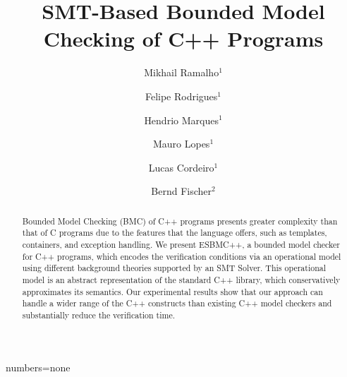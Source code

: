 \documentclass[a4paper]{llncs}
\begin{document}
{numbers=none}
\lstset{language=C,basicstyle=\small}
\lstset{numbers=left, numberstyle=\tiny, stepnumber=1, numbersep=5pt}
\lstset{tabsize=2}
\lstset{firstnumber=1}
\lstset{frame=single}


\title{SMT-Based Bounded Model Checking of C++ Programs}
\author{Mikhail Ramalho$^1$ 	\and
	Felipe Rodrigues$^1$   	\and
	Hendrio Marques$^1$   	\and
	Mauro Lopes$^1$   	\and
	Lucas Cordeiro$^1$   	\and
	Bernd Fischer$^2$}

\maketitle

\begin{abstract}
Bounded Model Checking (BMC) of C++ programs presents greater
complexity than that of C programs due to the features that the language offers, such as
templates, containers, and exception handling. We present ESBMC++, a bounded
model checker for C++ programs, which encodes the verification conditions via
an operational model using different background theories supported 
by an SMT Solver. This operational model is an abstract representation of
the standard C++ library, which conservatively approximates its semantics. Our
experimental results show that our approach can handle a wider range of the C++
constructs than existing C++ model checkers and substantially reduce the verification time.
\end{abstract}

\end{document}
